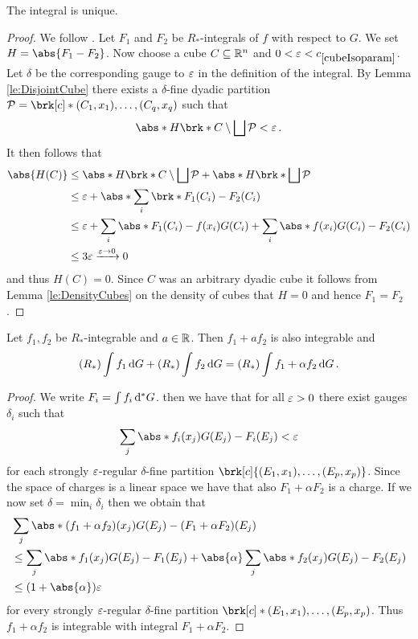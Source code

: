 \begin{claim}
The integral is unique.
\end{claim}
\begin{proof}
We follow \cite[Proposition 3.4]{Pfe2016}. Let $F_1$ and $F_2$ be $R_*$-integrals of $f$ with respect to $G$. We set $H=\abs{F_1-F_2}$. Now choose a cube $C\subseteq \mathbb{R}^n$ and $0<\e<\useconstant{cubeIsoparam}$. Let $\delta$ be the corresponding gauge to $\varepsilon$ in the definition of the integral. By Lemma \ref{le:DisjointCube} there exists a $\delta$-fine dyadic partition $\cP=\brk[c]*{(C_1,x_1),\dots,(C_q,x_q)}$ such that
\begin{align*}
	\abs*{H\brk*{C\setminus \bigsqcup\cP}}<\e\,.
\end{align*}
It then follows that
\begin{align*}
	\abs{H(C)}
	&\leq \abs*{H\brk*{C\setminus \bigsqcup\cP}}+\abs*{H\brk*{\bigsqcup\cP}} \\
	&\leq\e+\abs*{\sum_i\brk*{F_1(C_i)-F_2(C_i)}} \\
	&\leq \e+\sum_i\abs*{F_1(C_i)-f(x_i)G(C_i)} +\sum_i\abs*{f(x_i)G(C_i)-F_2(C_i)} \\
	&\leq 3\e\xrightarrow{\e\to0}0
\end{align*}
and thus $H(C)=0$. Since $C$ was an arbitrary dyadic cube it follows from 
Lemma \ref{le:DensityCubes} on the density of cubes that $H=0$ and hence $F_1=F_2$.

\end{proof}

\begin{claim}
Let $f_1,f_2$ be $R_*$-integrable and $a\in\mathbb{R}$. Then $f_1+af_2$ is also integrable and
\begin{align*}
	(R_*)\int f_1\,\mathrm{d} G + (R_*)\int f_2\,\mathrm{d} G=(R_*)\int f_1+\alpha f_2\,\mathrm{d} G\,.
\end{align*}
\end{claim}

\begin{proof}
We write $F_i=\int f_i\,\mathrm{d} ^*G$. then we have that for all $\varepsilon>0$ there exist gauges $\delta_i$ such that
\begin{align*}
	\sum_j\abs*{f_i(x_j)G(E_j)-F_i(E_j)}<\e
\end{align*}
for each strongly $\varepsilon$-regular $\delta$-fine partition $\brk[c]{(E_1,x_1),\dots,(E_p,x_p)}$. Since the space of charges is a linear space we have that also $F_1+\alpha F_2$ is a charge.
If we now set $\delta=\min_i\delta_i$ then we obtain that
\begin{align*}
	&\sum_j\abs*{(f_1+\alpha f_2)(x_j)G(E_j)-(F_1+\alpha F_2)(E_j)} \\
	&\leq \sum_j\abs*{f_1(x_j)G(E_j)-F_1(E_j)}+\abs{\alpha}\sum_j\abs*{f_2(x_j)G(E_j)-F_2(E_j)} \\
	&\leq (1+\abs{\alpha})\e
\end{align*}
for every strongly $\varepsilon$-regular $\delta$-fine partition $\brk[c]*{(E_1,x_1),\dots,(E_p,x_p)}$. Thus $f_1+\alpha f_2$ is integrable with integral $F_1+\alpha F_2$.
\end{proof}


